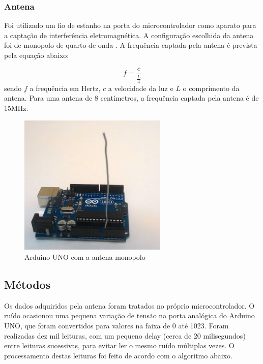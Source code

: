 \subsubsection{Antena}

Foi utilizado um fio de estanho na porta do microcontrolador como aparato para a captação de interferência eletromagnética. A configuração escolhida da antena foi de monopolo de quarto de onda \cite{Balanis2005}.
A frequência captada pela antena é prevista pela equação abaixo:

\begin{equation}
   f = \frac{c}{\frac{L}{4}}
  \end{equation}
sendo $f$ a frequência em Hertz, $c$ a velocidade da luz e $L$ o comprimento da antena. Para uma antena de 8 centímetros, a frequência
captada pela antena é de 15MHz.
 \begin{figure}[H]
 	\label{fig2}
 	\begin{centering}
 		\includegraphics[width = 200pt]{img/arduino2.png}
 		\caption{Arduino UNO com a antena monopolo}
 	\end{centering}	
 		
 \end{figure}

\subsection{Métodos}

Os dados adquiridos pela antena foram tratados no próprio microcontrolador. O ruído ocasionou uma pequena variação de tensão
na porta analógica do Arduino UNO, que foram convertidos para valores na faixa de 0 até 1023. Foram realizadas dez mil leituras, com um
pequeno delay (cerca de 20 milisegundos) entre leituras sucessivas, para evitar ler o mesmo ruído múltiplas vezes. O processamento destas
leituras foi feito de acordo com o algoritmo abaixo.

